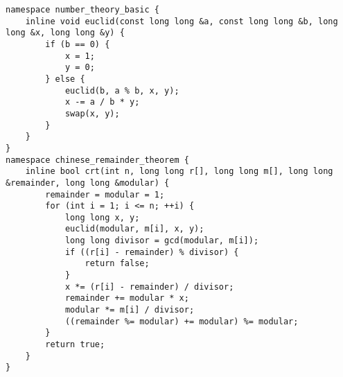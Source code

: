 \begin{lstlisting}
namespace number_theory_basic {
	inline void euclid(const long long &a, const long long &b, long long &x, long long &y) {
		if (b == 0) {
			x = 1;
			y = 0;
		} else {
			euclid(b, a % b, x, y);
			x -= a / b * y;
			swap(x, y);
		}
	}
}
namespace chinese_remainder_theorem {
	inline bool crt(int n, long long r[], long long m[], long long &remainder, long long &modular) {
		remainder = modular = 1;
		for (int i = 1; i <= n; ++i) {
			long long x, y;
			euclid(modular, m[i], x, y);
			long long divisor = gcd(modular, m[i]);
			if ((r[i] - remainder) % divisor) {
				return false;
			}
			x *= (r[i] - remainder) / divisor;
			remainder += modular * x;
			modular *= m[i] / divisor;
			((remainder %= modular) += modular) %= modular;
		}
		return true;
	}
}
\end{lstlisting}
